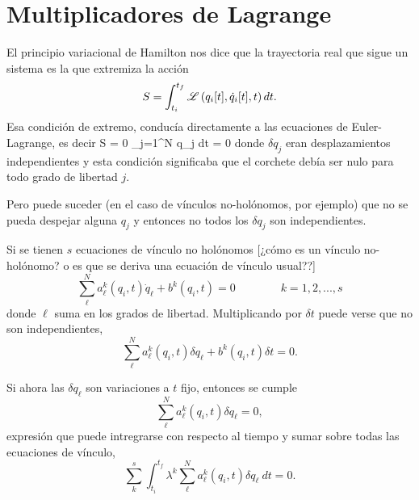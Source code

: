 \documentclass[10pt,oneside]{CBFT_book}
\begin{document}
\section{Multiplicadores de Lagrange}

El principio variacional de Hamilton nos dice que la trayectoria real que sigue un sistema es la que 
extremiza la acción
\[
	S = \int_{t_i}^{t_f} \mathscr{L} \left( q_i[t], \dot{q}_i[t], t \right) dt.
\]
Esa condición de extremo, conducía directamente a las ecuaciones de Euler-Lagrange, es decir
\be
	\delta S = 0 \quad \Leftrightarrow \quad \int \sum_{j=1}^{N} 
	\delta q_j \: dt = 0
	\label{accion_nula_ecsel}
\ee
donde $\delta q_j$ eran desplazamientos independientes y esta condición significaba que el corchete debía
ser nulo para todo grado de libertad $j$.

Pero puede suceder (en el caso de vínculos no-holónomos, por ejemplo) que no se pueda despejar alguna $ q_j $ y 
entonces no todos los  $\delta q_j$ son independientes.

Si se tienen $s$ ecuaciones de vínculo no holónomos [¿cómo es un vínculo no-holónomo? o es que se deriva una
ecuación de vínculo usual??]
\[
	\sum_{\ell}^N a_\ell^k(q_i,t) \dot{q}_\ell + b^k(q_i,t) = 0 \qquad \qquad k=1,2,...,s
\]
donde $\ell$ suma en los grados de libertad.
Multiplicando por $\delta t$ puede verse que no son independientes,
\[
	\sum_{\ell}^N a_\ell^k(q_i,t) \delta {q}_\ell + b^k(q_i,t) \delta t= 0 .
\]

Si ahora las $\delta q_\ell$ son variaciones a $t$ fijo, entonces se cumple 
\[
	\sum_{\ell}^N a_\ell^k(q_i,t) \delta {q}_\ell = 0,
\]
expresión que puede intregrarse con respecto al tiempo y sumar sobre todas las ecuaciones de vínculo,
\[
	\sum_{k}^s \int_{t_i}^{t_f} \lambda^k \sum_{\ell}^N a_\ell^k(q_i,t) \delta {q}_\ell \: dt = 0.
\]
\end{document}
